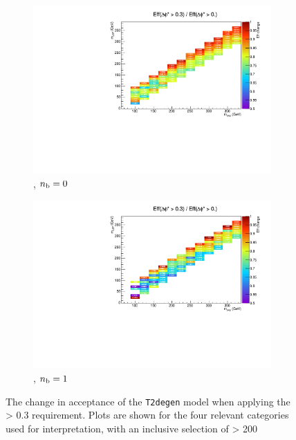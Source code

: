 \begin{figure}[h!]
  \begin{subfigure}[b]{0.46\textwidth}
    \includegraphics[width=\textwidth]
    {Figs/sms/t2degen/v19/eff_changes/eff_compare_2d_T2_4body_v19_vs_T2_4body_v20_eq0b_ge4j}
    \caption{\njhigh, $n_{\text{b}} = 0$}
    \label{fig:t2degen_dphistar_eq0b_ge4j}
  \end{subfigure}
  \begin{subfigure}[b]{0.46\textwidth}
    \includegraphics[width=\textwidth]
    {Figs/sms/t2degen/v19/eff_changes/eff_compare_2d_T2_4body_v19_vs_T2_4body_v20_eq1b_ge4j}
    \caption{\njhigh, $n_{\text{b}} = 1$}
    \label{fig:t2degen_dphistar_eq1b_ge4j}
  \end{subfigure}
  \caption{The change in acceptance of the \texttt{T2degen} model when applying
  the \mindphistar > 0.3 requirement. Plots are shown for the four relevant
  categories used for interpretation, with an inclusive selection of \HT > 200
  \gev}
  \label{fig:t2degen_dphistar_effchange}
\end{figure}

